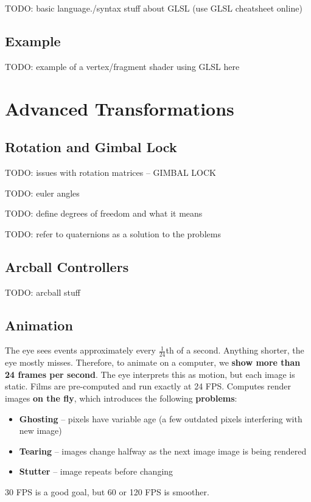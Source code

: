 \documentclass{article}
\begin{document}
TODO: basic language./syntax stuff about GLSL (use GLSL cheatsheet online)

\subsection{Example}

TODO: example of a vertex/fragment shader using GLSL here

\section{Advanced Transformations}

\subsection{Rotation and Gimbal Lock}

TODO: issues with rotation matrices -- GIMBAL LOCK

TODO: euler angles

TODO: define degrees of freedom and what it means

TODO: refer to quaternions as a solution to the problems

\subsection{Arcball Controllers}

TODO: arcball stuff

\subsection{Animation}

The eye sees events approximately every $\frac{1}{24}$th of a second. Anything shorter, the eye mostly misses. Therefore, to animate on a computer, we \textbf{show more than 24 frames per second}. The eye interprets this as motion, but each image is static. Films are pre-computed and run exactly at 24 FPS. Computes render images \textbf{on the fly}, which introduces the following \textbf{problems}:
\begin{itemize}
	\item \textbf{Ghosting} -- pixels have variable age (a few outdated pixels interfering with new image)
	\item \textbf{Tearing} -- images change halfway as the next image image is being rendered
	\item \textbf{Stutter} -- image repeats before changing
\end{itemize}
30 FPS is a good goal, but 60 or 120 FPS is smoother.
\end{document}
